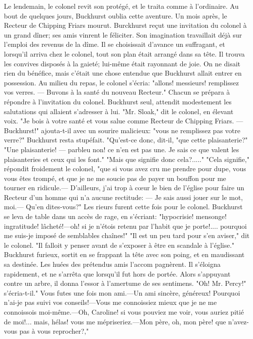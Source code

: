 Le lendemain, le colonel revit son protégé, et le traita comme à l'ordinaire. Au bout de quelques jours, Buckhurst oublia cette aventure. Un mois après, le Recteur de Chipping Friars mourut. Burckhurst reçut une invitation du colonel à un grand dîner; ses amis vinrent le féliciter. Son imagination travaillait déjà sur l'emploi des revenus de la dîme. Il se choisissait d'avance un suffragant, et lorsqu'il arriva chez le colonel, tout son plan était arrangé dans sa tête. Il trouva les convives disposés à la gaieté; lui-même était rayonnant de joie. On ne disait rien du bénéfice, mais c'était une chose entendue que Buckhurst allait entrer en possession.
Au milieu du repas, le colonel s'écria: "allons! messieurs! remplissez vos verres. — Buvons à la santé du nouveau Recteur." Chacun se prépara à répondre à l'invitation du colonel. Buckhurst seul, attendit modestement les salutations qui allaient s'adresser à lui.
"Mr. Sloak," dit le colonel, en élevant voix. "Je bois à votre santé et vous salue\setcounter{page}{411} comme Recteur de Chipping Friars. — Buckhurst!" ajouta-t-il avec un sourire malicieux: "vous ne remplissez pas votre verre?"
Buckhurst resta stupéfait. "Qu'est-ce donc, dit-il, "que cette plaisanterie?"
"Une plaisanterie! — parbleu non! ce n'en est pas une. Je sais ce que valent les plaisanteries et ceux qui les font."
"Mais que signifie donc cela?....."
"Cela signifie," répondit froidement le colonel, "que si vous avez cru me prendre pour dupe, vous vous êtes trompé, et que je ne me soucie pas de payer un bouffon pour me tourner en ridicule.— D'ailleurs, j'ai trop à cœur le bien de l'église pour faire un Recteur d'un homme qui n'a aucune rectitude: — Je sais aussi jouer sur le mot, moi.— Qu'en dites-vous?"
Les rieurs furent cette fois pour le colonel. Buckhurst se leva de table dans un accès de rage, en s'écriant: "hypocrisie! mensonge! ingratitude! lâcheté!—oh! si je n'étois retenu par l'habit que je porte!.... pourquoi me suis-je imposé de semblables chaînes!"
"Il est un peu tard pour s'en aviser," dit le colonel. "Il falloit y penser avant de s'exposer à être en scandale à l'église."
Buckhurst furieux, sortit en se frappant la tête avec son poing, et en maudissant sa destinée. Les huées des prétendus amis l'accom\setcounter{page}{412} pagnèrent. Il s'éloigna rapidement, et ne s'arrêta que lorsqu'il fut hors de portée. Alors s'appuyant contre un arbre, il donna l'essor à l'amertume de ses sentimens. "Oh! Mr. Percy!" s'écria-t-il." Vous futes une fois mon ami.—Un ami sincère, généreux! Pourquoi n'ai-je pas suivi vos conseils!—Vous me connoissiez mieux que je ne me connoissois moi-même.—Oh, Caroline! si vous pouviez me voir, vous auriez pitié de moi!... mais, hélas! vous me mépriseriez.—Mon père, oh, mon père! que n'avez-vous pas à vous reprocher?,"
